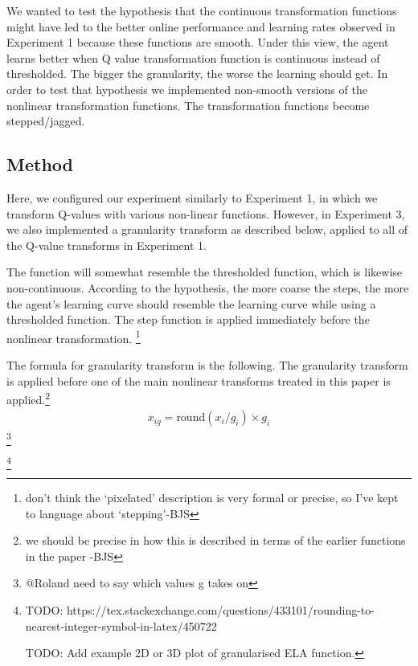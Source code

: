 

We wanted to test the hypothesis that the continuous transformation functions might have led to the better online performance and learning rates observed in Experiment 1 because these functions are smooth. Under this view, the agent learns better when Q value transformation function is continuous instead of thresholded. The bigger the granularity, the worse the learning should get. In order to test that hypothesis we implemented non-smooth versions of the nonlinear transformation functions. The transformation functions become stepped/jagged.

\subsection{Method}

Here, we configured our experiment similarly to Experiment 1, in which we transform Q-values with various non-linear functions. However, in Experiment 3, we also implemented a granularity transform as described below, applied to all of the Q-value transforms in Experiment 1.

The function will somewhat resemble the thresholded function, which is likewise non-continuous. According to the hypothesis, the more coarse the steps, the more the agent's learning curve should resemble the learning curve while using a thresholded function. The step function is applied immediately before the nonlinear transformation. \footnote{don't think the `pixelated' description is very formal or precise, so I've kept to language about `stepping'-BJS}

The formula for granularity transform is the following. The granularity transform is applied before one of the main nonlinear transforms treated in this paper is applied.\footnote{we should be precise in how this is described in terms of the earlier functions in the paper -BJS}
\begin{align}
x_{ig} = \text{round}(x_i / g_i) \times g_i
\end{align} \footnote{@Roland need to say which values g takes on}



\footnote{TODO: https://tex.stackexchange.com/questions/433101/rounding-to-nearest-integer-symbol-in-latex/450722

TODO: Add example 2D or 3D plot of granularised ELA function.}



